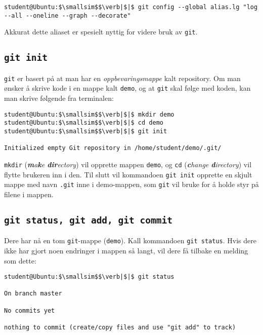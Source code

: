 \begin{alphasection}
\begin{lstlisting}[mathescape=true]
student@Ubuntu:$\smallsim$$\verb|$|$ git config --global alias.lg "log --all --oneline --graph --decorate"
\end{lstlisting}

Akkurat dette aliaset er spesielt nyttig for videre bruk av \verb|git|.




\subsection{\texttt{git init}}

\verb|git| er basert på at man har en \textit{oppbevaringsmappe} kalt repository. Om man ønsker å skrive kode i en mappe kalt \verb|demo|, og at \verb|git| skal følge med koden, kan man skrive følgende fra terminalen: 

\begin{lstlisting}[mathescape=true]
student@Ubuntu:$\smallsim$$\verb|$|$ mkdir demo
student@Ubuntu:$\smallsim$$\verb|$|$ cd demo
student@Ubuntu:$\smallsim$$\verb|$|$ git init

Initialized empty Git repository in /home/student/demo/.git/
\end{lstlisting}

\verb|mkdir| (\textit{\textbf{m}a\textbf{k}e \textbf{dir}ectory}) vil opprette mappen \verb|demo|, og \verb|cd| (\textit{\textbf{c}hange \textbf{d}irectory}) vil flytte brukeren inn i den. Til slutt vil kommandoen \verb|git init| opprette en skjult mappe med navn \verb|.git| inne i demo-mappen, som \verb|git| vil bruke for å holde styr på filene i mappen.

\subsection{\texttt{git status, git add, git commit}}


Dere har nå en tom \verb|git|-mappe (\verb|demo|). Kall kommandoen \verb|git status|. Hvis dere ikke har gjort noen endringer i mappen så langt, vil dere få tilbake en melding som dette:

\begin{lstlisting}[mathescape=true]
student@Ubuntu:$\smallsim$$\verb|$|$ git status

On branch master

No commits yet

nothing to commit (create/copy files and use "git add" to track)
\end{lstlisting}



\end{alphasection}
